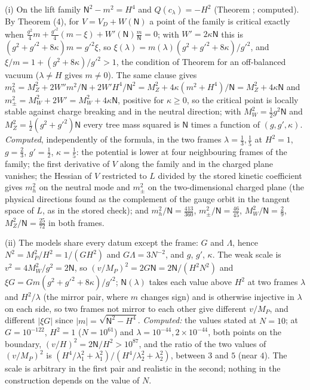 (i) On the lift family $\mathsf{N}^{2} - m^{2} = H^{4}$ and $Q(c_{\lambda}) = -H^{2}$ (Theorem ; computed). By Theorem (4), for $V = V_{D} + W(\mathsf{N})$ a point of the family is critical exactly when $\tfrac{g^{2}}{4}m + \tfrac{g'^{2}}{4}(m - \xi) + W'(\mathsf{N})\tfrac{m}{\mathsf{N}} = 0$; with $W' = 2\kappa\mathsf{N}$ this is $(g^{2} + g'^{2} + 8\kappa)m = g'^{2}\xi$, so $\xi(\lambda) = m(\lambda)(g^{2} + g'^{2} + 8\kappa)/g'^{2}$, and $\xi/m = 1 + (g^{2} + 8\kappa)/g'^{2} > 1$, the condition of Theorem  for an off-balanced vacuum ($\lambda \ne H$ gives $m \ne 0$). The same clause gives $m_{h}^{2} = M_{Z}^{2} + 2W''m^{2}/\mathsf{N} + 2W'H^{4}/\mathsf{N}^{2} = M_{Z}^{2} + 4\kappa(m^{2} + H^{4})/\mathsf{N} = M_{Z}^{2} + 4\kappa\mathsf{N}$ and $m_{\pm}^{2} = M_{W}^{2} + 2W' = M_{W}^{2} + 4\kappa\mathsf{N}$, positive for $\kappa \ge 0$, so the critical point is locally stable against charge breaking and in the neutral direction; with $M_{W}^{2} = \tfrac12 g^{2}\mathsf{N}$ and $M_{Z}^{2} = \tfrac12(g^{2} + g'^{2})\mathsf{N}$ every tree mass squared is $\mathsf{N}$ times a function of $(g, g', \kappa)$. \emph{Computed}, independently of the formula, in the two frames $\lambda = \tfrac13, \tfrac15$ at $H^{2} = 1$, $g = \tfrac23$, $g' = \tfrac12$, $\kappa = \tfrac15$: the potential is lower at four neighbouring frames of the family; the first derivative of $V$ along the family and in the charged plane vanishes; the Hessian of $V$ restricted to $L$ divided by the stored kinetic coefficient gives $m_{h}^{2}$ on the neutral mode and $m_{\pm}^{2}$ on the two-dimensional charged plane (the physical directions found as the complement of the gauge orbit in the tangent space of $L$, as in the stored check); and $m_{h}^{2}/\mathsf{N} = \tfrac{413}{360}$, $m_{\pm}^{2}/\mathsf{N} = \tfrac{46}{45}$, $M_{W}^{2}/\mathsf{N} = \tfrac29$, $M_{Z}^{2}/\mathsf{N} = \tfrac{25}{72}$ in both frames.

(ii) The models share every datum except the frame: $G$ and $\Lambda$, hence $N^{2} = M_{P}^{2}/H^{2} = 1/(GH^{2})$ and $G\Lambda = 3N^{-2}$, and $g$, $g'$, $\kappa$. The weak scale is $v^{2} = 4M_{W}^{2}/g^{2} = 2\mathsf{N}$, so $(v/M_{P})^{2} = 2G\mathsf{N} = 2\mathsf{N}/(H^{2}N^{2})$ and $\xi G = Gm(g^{2} + g'^{2} + 8\kappa)/g'^{2}$; $\mathsf{N}(\lambda)$ takes each value above $H^{2}$ at two frames $\lambda$ and $H^{2}/\lambda$ (the mirror pair, where $m$ changes sign) and is otherwise injective in $\lambda$ on each side, so two frames not mirror to each other give different $v/M_{P}$, and different $|\xi G|$ since $|m| = \sqrt{\mathsf{N}^{2} - H^{4}}$. \emph{Computed:} the values stated at $N = 10$; at $G = 10^{-122}$, $H^{2} = 1$ ($N = 10^{61}$) and $\lambda = 10^{-44}, 2 \times 10^{-44}$, both points on the boundary, $(v/H)^{2} = 2\mathsf{N}/H^{2} > 10^{87}$, and the ratio of the two values of $(v/M_{P})^{2}$ is $(H^{4}/\lambda_{1}^{2} + \lambda_{1}^{2})/(H^{4}/\lambda_{2}^{2} + \lambda_{2}^{2})$, between $3$ and $5$ (near $4$). The scale is arbitrary in the first pair and realistic in the second; nothing in the construction depends on the value of $N$.

